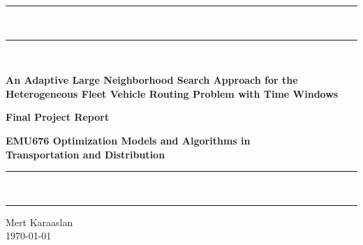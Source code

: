 \documentclass[11pt]{article}
\begin{document}
\begin{center}
{\noindent\rule{\textwidth}{2.5pt}}\\[0.35em]
{\noindent\rule{\textwidth}{1pt}}\\[0.8em]
{\Huge\bfseries An Adaptive Large Neighborhood Search Approach for the Heterogeneous Fleet Vehicle Routing Problem with Time Windows\par}
\vspace{0.6em}
{\large\bfseries Final Project Report\par}
\vspace{0.2em}
{\large\bfseries EMU676 Optimization Models and Algorithms in\\ Transportation and Distribution\par}
\vspace{0.8em}
{\noindent\rule{\textwidth}{1pt}}\\[0.35em]
{\noindent\rule{\textwidth}{2.5pt}}
\end{center}

\vspace{1.5em}
\begin{center}
{\large Mert Karaaslan}\\[0.3em]
{\normalsize \today}
\end{center}

\vspace{1.5em}

\begin{abstract}
The Heterogeneous Fleet Vehicle Routing Problem with Time Windows (HFVRPTW) is a generalization of the classical VRPTW in which a depot dispatches a limited fleet composed of multiple vehicle types with different capacities and cost structures. Larger vehicles have higher fixed costs but lower per-distance costs, making them economical for consolidated long routes, whereas smaller vehicles offer flexibility for low-demand or geographically scattered customers. This work presents an Adaptive Large Neighborhood Search (ALNS) metaheuristic tailored to the HFVRPTW. The algorithm employs multiple problem-specific destroy and repair operators (random, worst, Shaw/related, route, and vehicle-type-aware removals together with greedy, regret-$k$, and vehicle-type-aware insertions), an adaptive operator selection mechanism based on roulette-wheel weighting and historical performance scores, and a simulated-annealing-style acceptance criterion. The algorithm is evaluated on Solomon-derived heterogeneous fleet benchmark instances, focusing on solution quality, robustness, and operator behavior. The work contributes to the metaheuristic literature by providing a comprehensive ALNS design and analysis for the HFVRPTW with detailed algorithmic choices, parameter settings, and reproducible experimental protocols. The complete implementation, benchmark data, and experimental scripts are publicly available at \url{https://github.com/mkaraaslan/alns-hfvrptw}.
\end{abstract}
\end{document}
